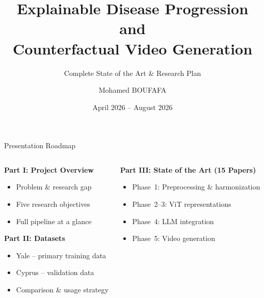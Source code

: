 \documentclass[aspectratio=169,xcolor=dvipsnames]{beamer}
\title{Explainable Disease Progression and\\Counterfactual Video Generation}
\subtitle{Complete State of the Art \& Research Plan}
\author{Mohamed BOUFAFA}
\institute
{
    Mitacs Globalink Research Internship 2026 \\[0.3em]
    T\'{E}LUQ University, Montreal, Canada \\[0.5em]
    \textbf{Supervisors:} \\
    Dr.\ Belkacem Chikhaoui (T\'{E}LUQ) \\
    Dr.\ Belkacem Khaldi (Algeria)
}
\date{April 2026 -- August 2026}
\begin{document}
\begin{frame}
    \titlepage
\end{frame}

\begin{frame}{Presentation Roadmap}
    \begin{columns}[t]
        \begin{column}{0.48\textwidth}
            \begin{block}{\textbf{Part I: Project Overview}}
                \begin{itemize}
                    \item Problem \& research gap
                    \item Five research objectives
                    \item Full pipeline at a glance
                \end{itemize}
            \end{block}

            \vspace{0.3em}

            \begin{block}{\textbf{Part II: Datasets}}
                \begin{itemize}
                    \item Yale -- primary training data
                    \item Cyprus -- validation data
                    \item Comparison \& usage strategy
                \end{itemize}
            \end{block}
        \end{column}

        \begin{column}{0.48\textwidth}
            \begin{block}{\textbf{Part III: State of the Art (15 Papers)}}
                \begin{itemize}
                    \item Phase~1: Preprocessing \& harmonization
                    \item Phase~2--3: ViT representations
                    \item Phase~4: LLM integration
                    \item Phase~5: Video generation
                \end{itemize}
            \end{block}

            \vspace{0.3em}
        \end{column}
    \end{columns}
\end{frame}
\end{document}
